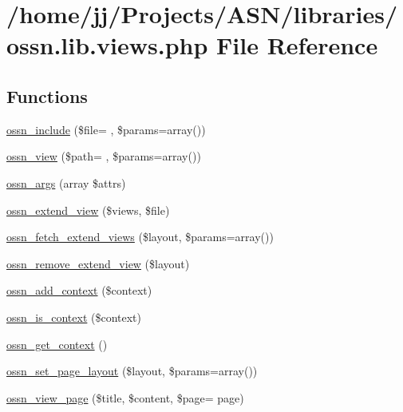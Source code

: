\hypertarget{ossn_8lib_8views_8php}{}\section{/home/jj/\+Projects/\+A\+S\+N/libraries/ossn.lib.\+views.\+php File Reference}
\label{ossn_8lib_8views_8php}
\subsection*{Functions}
\begin{DoxyCompactItemize}
\item 
\hyperlink{ossn_8lib_8views_8php_a6f7d3212da6386d53cf963ffe1af5138}{ossn\+\_\+include} (\$file= \textquotesingle{}\textquotesingle{}, \$params=array())
\item 
\hyperlink{ossn_8lib_8views_8php_ae16dfe3bfb4a6fa3036b1f87183380d4}{ossn\+\_\+view} (\$path= \textquotesingle{}\textquotesingle{}, \$params=array())
\item 
\hyperlink{ossn_8lib_8views_8php_a90922f09de8a06ea85351afb51fac9f7}{ossn\+\_\+args} (array \$attrs)
\item 
\hyperlink{ossn_8lib_8views_8php_aee3550839fe09204af21e2a5f6e835dc}{ossn\+\_\+extend\+\_\+view} (\$views, \$file)
\item 
\hyperlink{ossn_8lib_8views_8php_a839ae6f22b1010fdaae1514bdf275ee7}{ossn\+\_\+fetch\+\_\+extend\+\_\+views} (\$layout, \$params=array())
\item 
\hyperlink{ossn_8lib_8views_8php_acebe739135f3966f7e11fe616a7572fc}{ossn\+\_\+remove\+\_\+extend\+\_\+view} (\$layout)
\item 
\hyperlink{ossn_8lib_8views_8php_ad54fb1e96be7d93233b827eca7b99406}{ossn\+\_\+add\+\_\+context} (\$context)
\item 
\hyperlink{ossn_8lib_8views_8php_a9c5e42d8e9944c3b83b14ec075af64ff}{ossn\+\_\+is\+\_\+context} (\$context)
\item 
\hyperlink{ossn_8lib_8views_8php_ab86182e7aa8c5bc61781af6c4ce92f73}{ossn\+\_\+get\+\_\+context} ()
\item 
\hyperlink{ossn_8lib_8views_8php_aaac231ebc8646d7c939acd667caaeb6a}{ossn\+\_\+set\+\_\+page\+\_\+layout} (\$layout, \$params=array())
\item 
\hyperlink{ossn_8lib_8views_8php_a3ec93a07297ab93df41dc84b96a68249}{ossn\+\_\+view\+\_\+page} (\$title, \$content, \$page= \textquotesingle{}page\textquotesingle{})

\end{DoxyCompactItemize}
